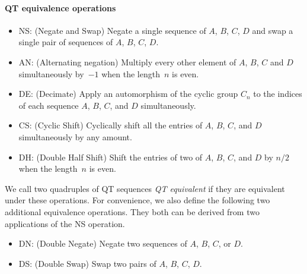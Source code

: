 \documentclass[12pt]{article}
\numberwithin{equation}{section}
\begin{document}
\paragraph{QT equivalence operations}
\begin{itemize}
    \item NS: (Negate and Swap) Negate a single sequence of $A$, $B$, $C$, $D$ and swap a single pair of sequences of $A$, $B$, $C$, $D$.
    \item AN: (Alternating negation) Multiply every other element of $A$, $B$, $C$ and $D$ simultaneously by~$-1$ when the length~$n$ is even.
    \item DE: (Decimate) Apply an automorphism of the cyclic group $C_n$ to the indices of each sequence $A$, $B$, $C$, and $D$ simultaneously.
    \item CS: (Cyclic Shift) Cyclically shift all the entries of $A$, $B$, $C$, and $D$ simultaneously by any amount.
    \item DH: (Double Half Shift) Shift the entries of two of $A$, $B$, $C$, and $D$ by $n/2$ when the length~$n$ is even.
\end{itemize}
We call two quadruples of QT sequences \emph{QT equivalent} if they are equivalent
under these operations.  For convenience, we also define the following two additional equivalence operations. They both can be derived from
two applications of the NS operation.

\begin{itemize}
    \item DN: (Double Negate) Negate two sequences of $A$, $B$, $C$, or $D$.
    \item DS: (Double Swap) Swap two pairs of $A$, $B$, $C$, $D$.
\end{itemize}
\end{document}
